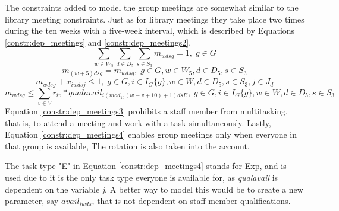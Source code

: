The constraints added to model the group meetings are somewhat similar to the library meeting constraints. Just as for library meetings they take place two times during the ten weeks with a five-week interval, which is described by Equations \ref{constr:dep_meetings} and \ref{constr:dep_meetings2}.
\begin{equation} \label{constr:dep_meetings}
\sum_{w \in W_5}\sum_{d \in D_5}\sum_{s \in S_3} m_{wdsg} = 1, \; g \in G
\end{equation}
\begin{equation} \label{constr:dep_meetings2}
m_{(w+5)dsg} = m_{wdsg}, \;   g \in G, w \in W_5, d \in D_5, s \in S_3
\end{equation}
\begin{equation} \label{constr:dep_meetings3}
m_{wdsg} + x_{iwdsj} \leq 1, \;   g \in G, i \in I_{G}\{g\}, w \in W, d \in D_5, s \in S_3, j \in J_d
\end{equation}
\begin{equation} \label{constr:dep_meetings4}
m_{wdsg} \leq \sum_{v \in V} r_{iv}*qualavail_{i(mod_{10}(w-v+10)+1)dsE}, \;   g \in G, i \in I_{G}\{g\}, w \in W, d \in D_5, s \in S_3
\end{equation}
Equation \ref{constr:dep_meetings3} prohibits a staff member from multitasking, that is, to attend a meeting and work with a task simultaneously. Lastly, Equation \ref{constr:dep_meetings4} enables group meetings only when everyone in that group is available, The rotation is also taken into the account.

The task type "E" in Equation \ref{constr:dep_meetings4} stands for Exp, and is used due to it is the only task type everyone is available for, as \textit{qualavail} is dependent on the variable \textit{j}. A better way to model this would be to create a new parameter, say $avail_{iwds}$, that is not dependent on staff member qualifications. 


